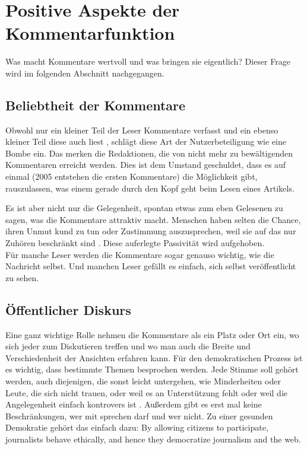 \chapter{Positive Aspekte der Kommentarfunktion}

Was macht Kommentare wertvoll und was bringen sie eigentlich? Dieser Frage wird
im folgenden Abschnitt nachgegangen.


\section{Beliebtheit der Kommentare} \label{sec:beliebtheit}
Obwohl nur ein kleiner Teil der Leser Kommentare verfasst und ein ebenso kleiner
Teil diese auch liest \autocite[96ff]{reich}, schlägt diese Art der
Nutzerbeteiligung wie eine Bombe ein. Das merken die Redaktionen, die von nicht
mehr zu bewältigenden Kommentaren erreicht werden. Dies ist dem Umstand
geschuldet, dass es auf einmal (2005 entstehen die ersten Kommentare) die
Möglichkeit gibt, rauszulassen, was einem gerade durch den Kopf geht beim Lesen
eines Artikels.

Es ist aber nicht nur die Gelegenheit, spontan etwas zum eben Gelesenen zu sagen,
was die Kommentare attraktiv macht. Menschen haben selten die Chance, ihren
Unmut kund zu tun oder Zustimmung auszusprechen, weil sie auf das nur Zuhören
beschränkt sind \autocite[S.~99]{reich}. Diese auferlegte Passivität wird
aufgehoben.\\
Für manche Leser werden die Kommentare sogar genauso wichtig, wie die Nachricht
selbst. Und manchen Leser gefällt es einfach, sich selbst veröffentlicht zu
sehen.


\section{Öffentlicher Diskurs}
Eine ganz wichtige Rolle nehmen die Kommentare als ein Platz oder Ort ein, wo
sich jeder zum Diskutieren treffen und wo man auch die Breite und
Verschiedenheit der Ansichten erfahren kann. Für den demokratischen Prozess ist
es wichtig, dass bestimmte Themen besprochen werden. Jede Stimme soll gehört
werden, auch diejenigen, die sonst leicht untergehen, wie Minderheiten oder
Leute, die sich nicht trauen, oder weil es an Unterstützung fehlt oder weil die
Angelegenheit einfach kontrovers ist \autocite[S.~12]{santana:2014}. Außerdem
gibt es erst mal keine Beschränkungen, wer mit sprechen darf und wer nicht.  Zu
einer gesunden Demokratie gehört das einfach dazu: \glqq By allowing citizens to
participate, journalists behave ethically, and hence they democratize journalism
and the web.\grqq\- \autocite[S.~125]{singer}

